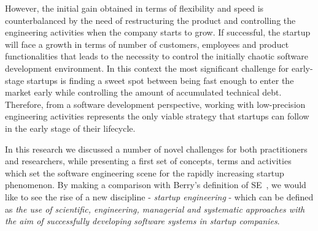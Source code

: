 \documentclass[10pt,journal,letterpaper,compsoc]{IEEEtran}
\begin{document}
However, the initial gain obtained in terms of flexibility and speed is
counterbalanced by the need of restructuring the product and controlling the
engineering activities when the company starts to grow. If successful, the
startup will face a growth in terms of number of customers, employees and
product functionalities that leads to the necessity to control the initially
chaotic software development environment. In this context the most significant
challenge for early-stage startups is finding a sweet spot between being fast
enough to enter the market early while controlling the amount of accumulated
technical debt.  %
Therefore, from a software development perspective, working with low-precision 
engineering activities represents the only viable strategy that startups can 
follow in the early stage of their lifecycle.

In this research we discussed a number of novel challenges for both
practitioners and researchers, while presenting a first set of concepts, terms
and activities which set the software engineering scene for the rapidly
increasing startup phenomenon. By making a comparison with Berry's definition of
SE~\cite{Berry1992}, we would like to see the rise of a new discipline -
\textit{startup engineering} - which can be defined as \textit{the use of
scientific, engineering, managerial and systematic approaches with the aim of
successfully developing software systems in startup companies}. %


%
\end{document}

